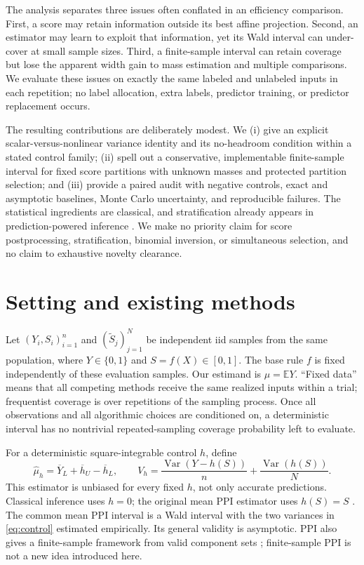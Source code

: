 \documentclass{article}
\newcommand{\E}{\mathbb E}
\newcommand{\Var}{\operatorname{Var}}
\begin{document}
The analysis separates three issues often conflated in an efficiency comparison. First, a score may retain information outside its best affine projection. Second, an estimator may learn to exploit that information, yet its Wald interval can under-cover at small sample sizes. Third, a finite-sample interval can retain coverage but lose the apparent width gain to mass estimation and multiple comparisons. We evaluate these issues on exactly the same labeled and unlabeled inputs in each repetition; no label allocation, extra labels, predictor training, or predictor replacement occurs.

The resulting contributions are deliberately modest. We (i) give an explicit scalar-versus-nonlinear variance identity and its no-headroom condition within a stated control family; (ii) spell out a conservative, implementable finite-sample interval for fixed score partitions with unknown masses and protected partition selection; and (iii) provide a paired audit with negative controls, exact and asymptotic baselines, Monte Carlo uncertainty, and reproducible failures. The statistical ingredients are classical, and stratification already appears in prediction-powered inference \citep{stratppi}. We make no priority claim for score postprocessing, stratification, binomial inversion, or simultaneous selection, and no claim to exhaustive novelty clearance.

\section{Setting and existing methods}\label{sec:setting}
Let $(Y_i,S_i)_{i=1}^n$ and $(\widetilde S_j)_{j=1}^N$ be independent iid samples from the same population, where $Y\in\{0,1\}$ and $S=f(X)\in[0,1]$. The base rule $f$ is fixed independently of these evaluation samples. Our estimand is $\mu=\E Y$. ``Fixed data'' means that all competing methods receive the same realized inputs within a trial; frequentist coverage is over repetitions of the sampling process. Once all observations and all algorithmic choices are conditioned on, a deterministic interval has no nontrivial repeated-sampling coverage probability left to evaluate.

For a deterministic square-integrable control $h$, define
\begin{equation}\label{eq:control}
 \widehat\mu_h=\overline Y_L+\overline h_U-\overline h_L,\qquad
 V_h=\frac{\Var(Y-h(S))}{n}+\frac{\Var(h(S))}{N}.
\end{equation}
This estimator is unbiased for every fixed $h$, not only accurate predictions. Classical inference uses $h=0$; the original mean PPI estimator uses $h(S)=S$ \citep[Algorithm 1]{ppi}. The common mean PPI interval is a Wald interval with the two variances in \eqref{eq:control} estimated empirically. Its general validity is asymptotic. PPI also gives a finite-sample framework from valid component sets \citep[Theorem 1]{ppi}; finite-sample PPI is not a new idea introduced here.
\end{document}
